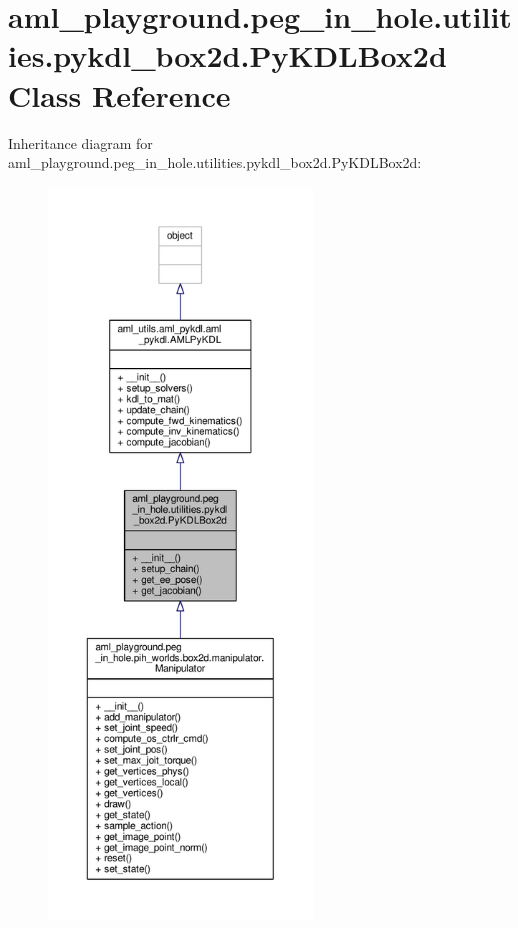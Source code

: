 \hypertarget{classaml__playground_1_1peg__in__hole_1_1utilities_1_1pykdl__box2d_1_1_py_k_d_l_box2d}{\section{aml\-\_\-playground.\-peg\-\_\-in\-\_\-hole.\-utilities.\-pykdl\-\_\-box2d.\-Py\-K\-D\-L\-Box2d Class Reference}
\label{classaml__playground_1_1peg__in__hole_1_1utilities_1_1pykdl__box2d_1_1_py_k_d_l_box2d}
}


Inheritance diagram for aml\-\_\-playground.\-peg\-\_\-in\-\_\-hole.\-utilities.\-pykdl\-\_\-box2d.\-Py\-K\-D\-L\-Box2d\-:
\nopagebreak
\begin{figure}[H]
\begin{center}
\leavevmode
\includegraphics[height=550pt]{classaml__playground_1_1peg__in__hole_1_1utilities_1_1pykdl__box2d_1_1_py_k_d_l_box2d__inherit__graph}
\end{center}
\end{figure}



